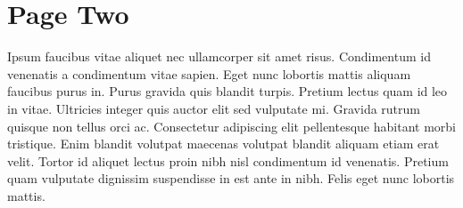 \section{Page Two}

Ipsum faucibus vitae aliquet nec ullamcorper sit amet risus. Condimentum id venenatis a condimentum vitae sapien. Eget nunc lobortis mattis aliquam faucibus purus in. Purus gravida quis blandit turpis. Pretium lectus quam id leo in vitae. Ultricies integer quis auctor elit sed vulputate mi. Gravida rutrum quisque non tellus orci ac. Consectetur adipiscing elit pellentesque habitant morbi tristique. Enim blandit volutpat maecenas volutpat blandit aliquam etiam erat velit. Tortor id aliquet lectus proin nibh nisl condimentum id venenatis. Pretium quam vulputate dignissim suspendisse in est ante in nibh. Felis eget nunc lobortis mattis.
